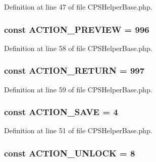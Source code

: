 Definition at line 47 of file CPSHelperBase.php.

\hypertarget{classCPSHelperBase_a4bd6b76d55b3a5f5cecaaf7489dbcd88}{
\subsubsection[{ACTION\_\-PREVIEW}]{\setlength{\rightskip}{0pt plus 5cm}const {\bf ACTION\_\-PREVIEW} = 996}}
\label{classCPSHelperBase_a4bd6b76d55b3a5f5cecaaf7489dbcd88}


Definition at line 58 of file CPSHelperBase.php.

\hypertarget{classCPSHelperBase_a6954c10c63953015a160f802f79e59d2}{
\subsubsection[{ACTION\_\-RETURN}]{\setlength{\rightskip}{0pt plus 5cm}const {\bf ACTION\_\-RETURN} = 997}}
\label{classCPSHelperBase_a6954c10c63953015a160f802f79e59d2}


Definition at line 59 of file CPSHelperBase.php.

\hypertarget{classCPSHelperBase_a4f9b91b9d04c6c9d7b6ebb8ceb70c0c0}{
\subsubsection[{ACTION\_\-SAVE}]{\setlength{\rightskip}{0pt plus 5cm}const {\bf ACTION\_\-SAVE} = 4}}
\label{classCPSHelperBase_a4f9b91b9d04c6c9d7b6ebb8ceb70c0c0}


Definition at line 51 of file CPSHelperBase.php.

\hypertarget{classCPSHelperBase_ae24b4d0d3bf45c296468bccbfb12a13b}{
\subsubsection[{ACTION\_\-UNLOCK}]{\setlength{\rightskip}{0pt plus 5cm}const {\bf ACTION\_\-UNLOCK} = 8}}
\label{classCPSHelperBase_ae24b4d0d3bf45c296468bccbfb12a13b}


